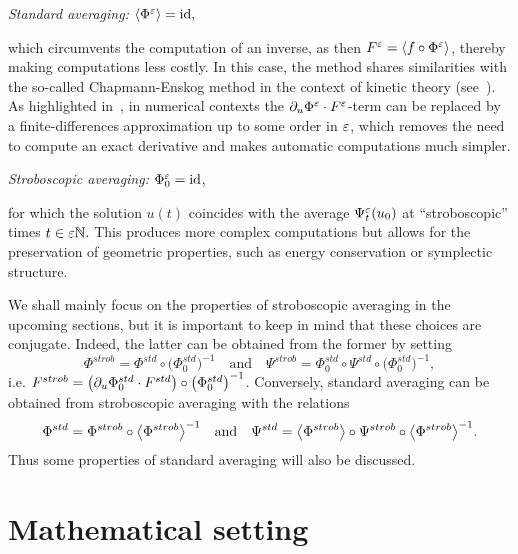 \smallskip\noindent
\textit{Standard averaging:} 
%
$ \langle \Phi^\varepsilon \rangle = \operatorname{id} ,$ 

\noindent\hfil\parbox[t]{0.85\textwidth}{%
which circumvents the computation of an inverse, as then $F^\varepsilon = \langle f
\circ \Phi^\varepsilon \rangle$, thereby making computations less costly. In this
case, the method shares similarities with the so-called Chapmann-Enskog
method in the context of kinetic theory
(see~\cite{chartier.2020.averaging}). As highlighted
in~\cite{chartier.2020.derivative}, in numerical contexts the $\partial_u
\Phi^\varepsilon \cdot F^\varepsilon$-term can be replaced by a finite-differences
approximation up to some order in $\varepsilon$, which removes the need to
compute an exact derivative and makes automatic computations much
simpler.
%
}\hfil%

\medskip\noindent
\textit{Stroboscopic averaging:}
\( \Phi^\varepsilon_0 = \operatorname{id} \),

\noindent\hfil\parbox[t]{0.85\textwidth}{%
for which the solution \( u(t) \) coincides with
the average \( \Psi^\varepsilon_t(u_0) \) at ``stroboscopic'' times \( t \in \varepsilon
\mathbb{N} \). This produces more complex computations but allows for the preservation of geometric properties, such as energy
conservation or symplectic structure. 
}\hfil%


\medskip\noindent %
We shall mainly focus on the properties of stroboscopic averaging in the
upcoming sections, but it is important to keep in mind that these
choices are conjugate. Indeed, the latter can be obtained from the
former by setting 
\begin{equation*}
  \Phi^{strob} = \Phi^{std} \circ \big( \Phi_0^{std} \big)^{-1} 
  \quad
  \text{and} 
  \quad
  \Psi^{strob} 
  = \Phi_0^{std} \circ \Psi^{std} \circ \big( \Phi_0^{std} \big)^{-1} ,
\end{equation*}
i.e. $F^{strob} = \left( \partial_u \Phi_0^{std} \cdot F^{std} \right) \circ
\big( \Phi_0^{std} \big)^{-1}$. Conversely, standard averaging can be
obtained from stroboscopic averaging with the relations
\begin{equation} \label{sec:presentation:eq:strob2std}
  \Phi^{std} = \Phi^{strob} \circ \big \langle \Phi^{strob} \big \rangle^{-1} 
  \quad
  \text{and} 
  \quad
  \Psi^{std} 
  = \big \langle\Phi^{strob}\big \rangle \circ \Psi^{strob} \circ 
    \big \langle\Phi^{strob}\big \rangle^{-1} .
\end{equation}
Thus some properties of standard averaging will also be discussed. 


\section{Mathematical setting}
\label{sec:hyp}

